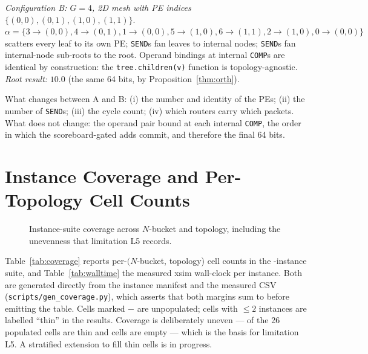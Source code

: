 \documentclass[journal,10pt]{IEEEtran}
\theoremstyle{plain}
\theoremstyle{definition}
\theoremstyle{remark}
\newcommand{\sv}[1]{\texttt{#1}}
\newcommand{\asgn}{\ensuremath{\alpha}}
\begin{document}
\emph{Configuration B: $G=4$, 2D mesh with PE indices
$\{(0,0),(0,1),(1,0),(1,1)\}$}. $\asgn = \{3\to(0,0), 4\to(0,1),
1\to(0,0), 5\to(1,0), 6\to(1,1), 2\to(1,0), 0\to(0,0)\}$ scatters
every leaf to its own PE; \texttt{SEND}s fan leaves to internal nodes;
\texttt{SEND}s fan internal-node sub-roots to the root. Operand bindings
at internal \texttt{COMP}s are identical by construction: the
\sv{tree.children(v)} function is topology-agnostic.
\emph{Root result:} $10.0$ (the same 64 bits, by Proposition~\ref{thm:orth}).

What changes between A and B: (i) the number and identity of the PEs;
(ii) the number of \texttt{SEND}s; (iii) the cycle count; (iv) which
routers carry which packets. What does not change: the operand pair
bound at each internal \texttt{COMP}, the order in which the
scoreboard-gated adds commit, and therefore the final 64 bits.

\section{Instance Coverage and Per-Topology Cell Counts}\label{app:coverage}

\begin{figure}[!t]\centering

\caption{Instance-suite coverage across $N$-bucket and topology, including the unevenness that limitation L5 records.}\label{fig:coverage}
\end{figure}


Table~\ref{tab:coverage} reports per-$(N$-bucket, topology) cell counts
in the \SuiteSize-instance suite, and Table~\ref{tab:walltime} the measured
xsim wall-clock per instance. Both are generated directly from the instance
manifest and the measured CSV (\sv{scripts/gen\_coverage.py}), which
asserts that both margins sum to \SuiteSize{} before emitting the table.
Cells marked $-$ are unpopulated;
cells with $\leq 2$ instances are labelled ``thin'' in the results. Coverage
is deliberately uneven --- \SuiteThinCells{} of the 26 populated cells are
thin and \SuiteEmptyCells{} cells are empty --- which is the basis for
limitation L5. A stratified extension to fill thin cells is in progress.

\begin{table}[!t]
\caption{Instance-suite cell counts by $N$-bucket and topology. Rows and
  columns both sum to the \SuiteSize-instance total.}
\label{tab:coverage}
\centering
\footnotesize
\renewcommand{\arraystretch}{1.15}

\end{table}
\end{document}
